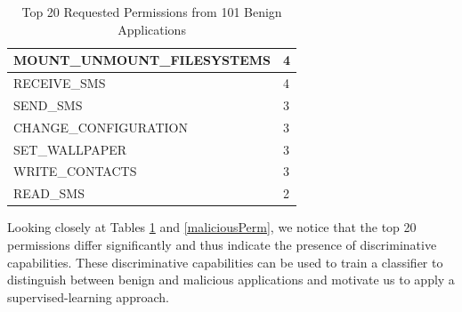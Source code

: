 \begin{table}[]
\begin{tabular}{|l|l|}
MOUNT\_UNMOUNT\_FILESYSTEMS       & 4                  \\ \hline
RECEIVE\_SMS                      & 4                  \\ \hline
SEND\_SMS                         & 3                  \\ \hline
CHANGE\_CONFIGURATION             & 3                  \\ \hline
SET\_WALLPAPER                    & 3                  \\ \hline
WRITE\_CONTACTS                   & 3                  \\ \hline
READ\_SMS                         & 2                  \\ \hline
\end{tabular}
\caption{Top 20 Requested Permissions from 101 Benign Applications}\label{benignPerm}
\end{table}
\normalsize
Looking closely at Tables \ref{benignPerm} and \ref{maliciousPerm}, we notice that the top 20 permissions differ significantly and thus indicate the presence of discriminative capabilities. These discriminative capabilities can be used to train a classifier to distinguish between benign and malicious applications and motivate us to apply a supervised-learning approach.
\small
